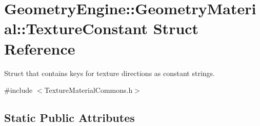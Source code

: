 \hypertarget{struct_geometry_engine_1_1_geometry_material_1_1_texture_constant}{}\section{Geometry\+Engine\+::Geometry\+Material\+::Texture\+Constant Struct Reference}
\label{struct_geometry_engine_1_1_geometry_material_1_1_texture_constant}


Struct that contains keys for texture directions as constant strings.  




{\ttfamily \#include $<$Texture\+Material\+Commons.\+h$>$}

\subsection*{Static Public Attributes}
